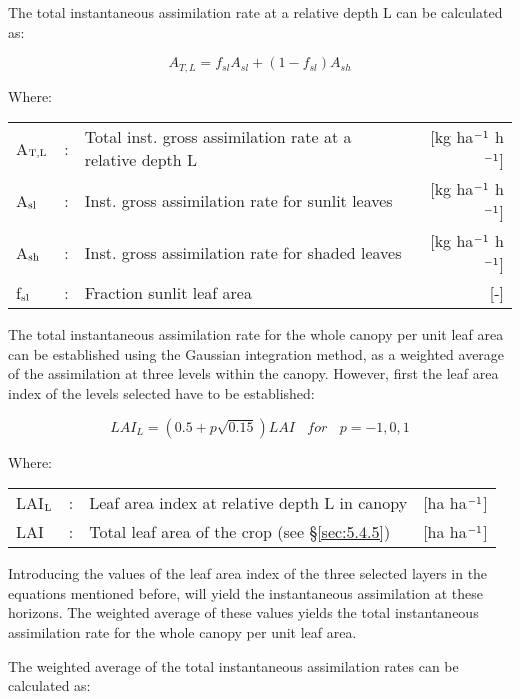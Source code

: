 The total instantaneous assimilation rate at a relative depth L can be calculated as:

\begin{equation}
\label{eq:5.28}
A_{T,L} = f_{sl} A_{sl} + (1 - f_{sl}) A_{sh} 
\end{equation}

Where:\\[5pt]
\begin{tabularx}{\textwidth}{llXr}
A$_{{\rm T,L}}$ &:& Total inst. gross assimilation rate at a relative depth L   &
     [kg ha$^{{\rm -1}}$ h$^{{\rm -1}}$]\\
A$_{{\rm sl}}$ &:& Inst. gross assimilation rate for sunlit leaves  & 
     [kg ha$^{{\rm -1}}$ h$^{{\rm -1}}$]\\
A$_{{\rm sh}}$ &:& Inst. gross assimilation rate for shaded leaves  & 
     [kg ha$^{{\rm -1}}$ h$^{{\rm -1}}$]\\
f$_{{\rm sl}}$ &:& Fraction sunlit leaf area  &  [-]\\
\end{tabularx}

The total instantaneous assimilation rate for the whole canopy per unit leaf area can be
established using the Gaussian integration method, as a weighted average of the assimilation 
at three levels within the canopy.
However, first the leaf area index of the levels selected have to be established:

\begin{equation}
\label{eq:5.29}
LAI_{L} = (0.5+p \sqrt{0.15})LAI~~~~for~~~~p=-1,0,1
\end{equation}

Where:\\[5pt]
\begin{tabularx}{\textwidth}{llXr}
LAI$_{{\rm L}}$ &:& Leaf area index at relative depth L in canopy    &    [ha ha$^{{\rm -1}}$]\\
LAI &:& Total leaf area of the crop (see \S \ref{sec:5.4.5}) &   [ha ha$^{{\rm -1}}$]\\
\end{tabularx}

Introducing the values of the leaf area index of the three selected layers in the equations
mentioned before, will yield the instantaneous assimilation at these horizons. The
weighted average of these values yields the total instantaneous assimilation rate for the
whole canopy per unit leaf area.

The weighted average of the total instantaneous assimilation rates can be calculated as:

